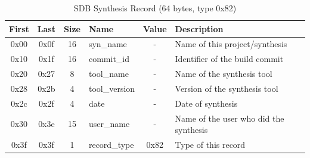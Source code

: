 \documentclass[a4paper, 12pt]{article}
\begin{document}
\begin{center}
  \begin{savenotes}
    \begin{table}[!ht]\footnotesize
      \caption{SDB Synthesis Record (64 bytes, type 0x82)}\label{sdb_synthesis}\centering
        \begin{tabular}{| c | c | c | l | c | p{5cm} |} \hline
        First & Last & Size & Name & Value & Description \\ \hline
        0x00 & 0x0f & 16 & syn\_name & - & Name of this project/synthesis \\ \hline
        0x10 & 0x1f & 16 & commit\_id & - & Identifier of the build commit \\ \hline
        0x20 & 0x27 & 8 & tool\_name & - & Name of the synthesis tool \\ \hline
        0x28 & 0x2b & 4 & tool\_version & - & Version of the synthesis tool \\ \hline
        0x2c & 0x2f & 4 & date & - & Date of synthesis \\ \hline
        0x30 & 0x3e & 15 & user\_name & - & Name of the user who did the synthesis \\ \hline
        0x3f & 0x3f & 1 & record\_type & 0x82 & Type of this record \\ \hline
        \end{tabular}
    \end{table}
  \end{savenotes}
\end{center}
\end{document}
